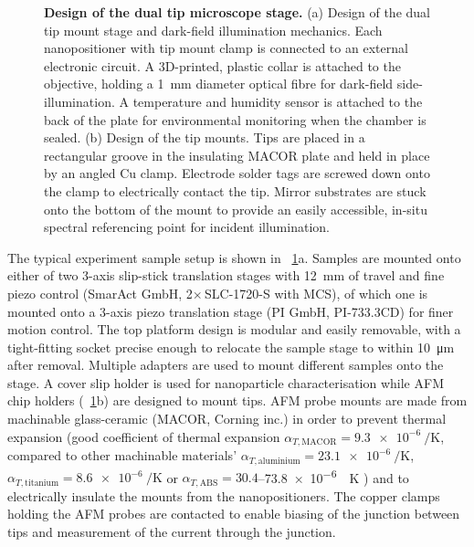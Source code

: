 \documentclass{article}
\begin{document}
\begin{figure}[bt]
\begin{subfigure}[t]{0.43\textwidth}
\end{subfigure}
\caption[Design of the dual tip microscope stage]{\textbf{Design of the dual tip microscope stage.}
(a) Design of the dual tip mount stage and dark-field illumination mechanics. Each nanopositioner with tip mount clamp is connected to an external electronic circuit. A 3D-printed, plastic collar is attached to the objective, holding a \SI{1}{mm} diameter optical fibre for dark-field side-illumination. A temperature and humidity sensor is attached to the back of the plate for environmental monitoring when the chamber is sealed.
(b) Design of the tip mounts. Tips are placed in a rectangular groove in the insulating MACOR plate and held in place by an angled Cu clamp. Electrode solder tags are screwed down onto the clamp to electrically contact the tip. Mirror substrates are stuck onto the bottom of the mount to provide an easily accessible, in-situ spectral referencing point for incident illumination.}
\label{fig:tip_mount_design}
\vspace{-15pt}
\end{figure}

The typical experiment sample setup is shown in \figurename~\ref{fig:tip_mount_design}a. Samples are mounted onto either of two 3-axis slip-stick translation stages with \SI{12}{mm} of travel and fine piezo control (SmarAct GmbH, 2$\times$\,SLC-1720-S with MCS), of which one is mounted onto a 3-axis piezo translation stage (PI GmbH, PI-733.3CD) for finer motion control. The top platform design is modular and easily removable, with a tight-fitting socket precise enough to relocate the sample stage to within \SI{10}{\micro\metre} after removal. Multiple adapters are used to mount different samples onto the stage. A cover slip holder is used for nanoparticle characterisation while AFM chip holders (\figurename~\ref{fig:tip_mount_design}b) are designed to mount tips.
AFM probe mounts are made from machinable glass-ceramic (MACOR, Corning inc.) in order to prevent thermal expansion (good coefficient of thermal expansion $\alpha_{T, \mathrm{MACOR}}=\SI{9.3e-6}{\per\kelvin}$, compared to other machinable materials' $\alpha_{T,\mathrm{aluminium}}=\SI{23.1e-6}{\per\kelvin}$, $\alpha_{T, \mathrm{titanium}}=\SI{8.6e-6}{\per\kelvin}$ or $\alpha_{T, \mathrm{ABS}}=30.4$--\SI{73.8e-6}{\per\kelvin} \cite{haynes2013crc}) and to electrically insulate the mounts from the nanopositioners. The copper clamps holding the AFM probes are contacted to enable biasing of the junction between tips and measurement of the current through the junction.
\end{document}
